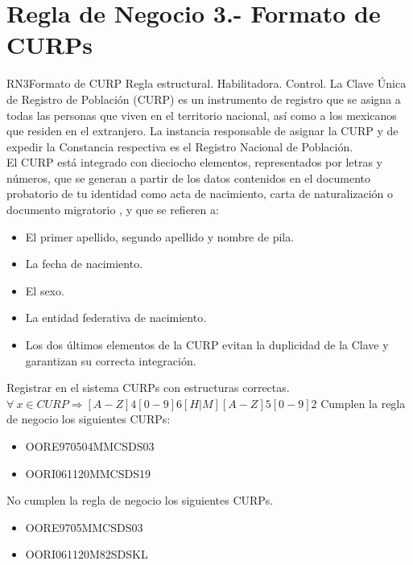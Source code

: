 \section{Regla de Negocio 3.- Formato de CURPs}

\begin{BussinesRule}{RN3}{Formato de CURP}
	\BRitem[Tipo:] Regla estructural. 
	\BRitem[Clase:] Habilitadora. 
	\BRitem[Nivel:] Control. %
	\BRitem[Descripción:] La Clave Única de Registro de Población (CURP) es un instrumento de registro que se asigna a todas las personas que viven en el territorio nacional, así como a los mexicanos que residen en el extranjero\cite{SG}. La instancia responsable de asignar la CURP y de expedir la Constancia respectiva es el Registro Nacional de Población.\\
	El CURP está integrado con dieciocho elementos, representados por letras y números, que se generan a partir de los datos contenidos en el documento probatorio de tu identidad como acta de nacimiento, carta de naturalización o documento migratorio \cite{SG}, y que se refieren a:
	        \begin{itemize}
	            \item El primer apellido, segundo apellido y nombre de pila.
	            \item La fecha de nacimiento.
	            \item El sexo.
	            \item La entidad federativa de nacimiento.
	            \item Los dos últimos elementos de la CURP evitan la duplicidad de la Clave y garantizan su correcta integración.
	           
	        \end{itemize}
	        
	
	\BRitem[Motivación:] Registrar en el sistema CURPs con estructuras correctas.
	\BRitem[Sentencia:] $\forall\ x \in CURP \Rightarrow  [A-Z]{4}[0-9]{6}[H|M][A-Z]{5}[0-9]{2}$
	 Cumplen la regla de negocio los siguientes CURPs:
        \begin{itemize}
			\item OORE970504MMCSDS03
			\item OORI061120MMCSDS19
        \end{itemize}
	 No cumplen la regla de negocio los siguientes CURPs.
		\begin{itemize}
        	\item OORE9705MMCSDS03
			\item OORI061120M82SDSKL
        	
    \end{itemize}
\end{BussinesRule}




